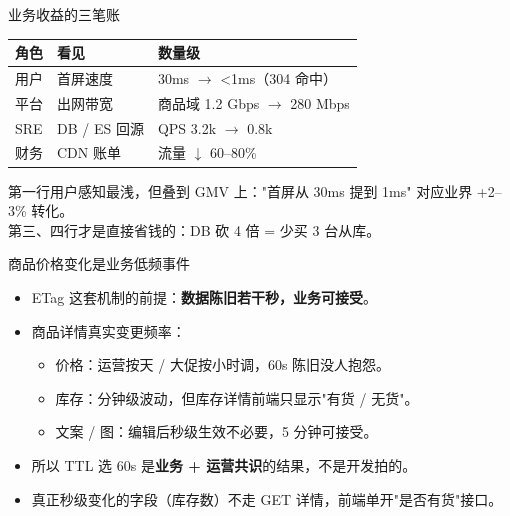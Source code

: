 \begin{frame}{业务收益的三笔账}
\begin{tabular}{@{}lll@{}}
\toprule
角色 & 看见 & 数量级 \\
\midrule
用户   & 首屏速度       & 30ms $\to$ <1ms（304 命中） \\
平台   & 出网带宽       & 商品域 1.2 Gbps $\to$ 280 Mbps \\
SRE   & DB / ES 回源   & QPS 3.2k $\to$ 0.8k \\
财务   & CDN 账单       & 流量 $\downarrow$ 60--80\% \\
\bottomrule
\end{tabular}
\vspace{3mm}
\small 第一行用户感知最浅，但叠到 GMV 上："首屏从 30ms 提到 1ms" 对应业界 +2--3\% 转化。\\
第三、四行才是直接省钱的：DB 砍 4 倍 = 少买 3 台从库。
\end{frame}

\begin{frame}{商品价格变化是业务低频事件}
\begin{itemize}
  \item ETag 这套机制的前提：\textbf{数据陈旧若干秒，业务可接受}。
  \item 商品详情真实变更频率：
  \begin{itemize}
    \item 价格：运营按天 / 大促按小时调，60s 陈旧没人抱怨。
    \item 库存：分钟级波动，但库存详情前端只显示"有货 / 无货"。
    \item 文案 / 图：编辑后秒级生效不必要，5 分钟可接受。
  \end{itemize}
  \item 所以 TTL 选 60s 是\textbf{业务 + 运营共识}的结果，不是开发拍的。
  \item 真正秒级变化的字段（库存数）不走 GET 详情，前端单开"是否有货"接口。
\end{itemize}
\end{frame}

